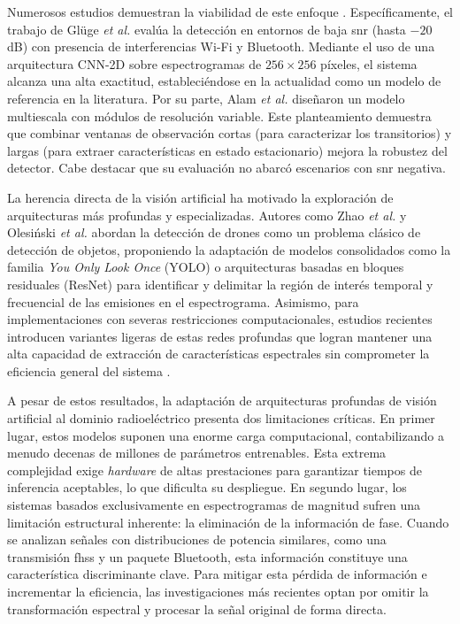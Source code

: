 Numerosos estudios demuestran la viabilidad de este enfoque \cite{olesinski_radio_2023, cai_toward_2024}. Específicamente, el trabajo de Glüge \textit{et al.} \cite{gluge_robust_2024} evalúa la detección en entornos de baja \gls{snr} (hasta $-20$\,dB) con presencia de interferencias Wi-Fi y Bluetooth. Mediante el uso de una arquitectura CNN-2D sobre espectrogramas de $256\times256$ píxeles, el sistema alcanza una alta exactitud, estableciéndose en la actualidad como un modelo de referencia en la literatura. Por su parte, Alam \textit{et al.} \cite{alam_rf-enabled_2023} diseñaron un modelo multiescala con módulos de resolución variable. Este planteamiento demuestra que combinar ventanas de observación cortas (para caracterizar los transitorios) y largas (para extraer características en estado estacionario) mejora la robustez del detector. Cabe destacar que su evaluación no abarcó escenarios con \gls{snr} negativa.

La herencia directa de la visión artificial ha motivado la exploración de arquitecturas más profundas y especializadas. Autores como Zhao \textit{et al.} \cite{zhao_drone_2024} y Olesiński \textit{et al.} \cite{olesinski_radio_2023} abordan la detección de drones como un problema clásico de detección de objetos, proponiendo la adaptación de modelos consolidados como la familia \textit{You Only Look Once} (YOLO) o arquitecturas basadas en bloques residuales (ResNet) para identificar y delimitar la región de interés temporal y frecuencial de las emisiones en el espectrograma. Asimismo, para implementaciones con severas restricciones computacionales, estudios recientes introducen variantes ligeras de estas redes profundas que logran mantener una alta capacidad de extracción de características espectrales sin comprometer la eficiencia general del sistema \cite{cai_toward_2024}.

A pesar de estos resultados, la adaptación de arquitecturas profundas de visión artificial al dominio radioeléctrico presenta dos limitaciones críticas. En primer lugar, estos modelos suponen una enorme carga computacional, contabilizando a menudo decenas de millones de parámetros entrenables. Esta extrema complejidad exige \textit{hardware} de altas prestaciones para garantizar tiempos de inferencia aceptables, lo que dificulta su despliegue. En segundo lugar, los sistemas basados exclusivamente en espectrogramas de magnitud sufren una limitación estructural inherente: la eliminación de la información de fase. Cuando se analizan señales con distribuciones de potencia similares, como una transmisión \gls{fhss} y un paquete Bluetooth, esta información constituye una característica discriminante clave. Para mitigar esta pérdida de información e incrementar la eficiencia, las investigaciones más recientes optan por omitir la transformación espectral y procesar la señal original de forma directa.

